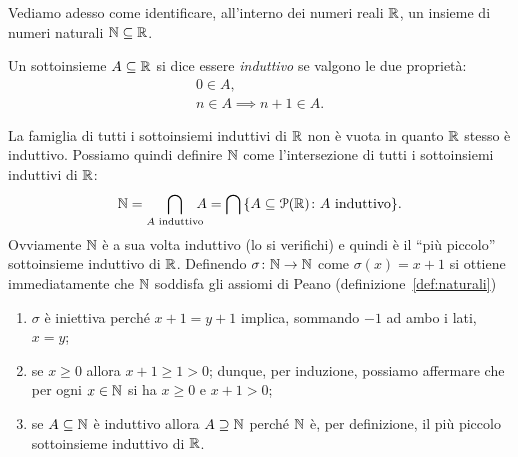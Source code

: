 Vediamo adesso come identificare, all'interno dei numeri reali ${\mathbb R}$,
un insieme di numeri naturali $\NN \subset \RR$.

\begin{definition}%
  \label{def:induttivo}%
  \mymargin{$\NN\subset \RR$}%
  Un sottoinsieme $A\subseteq {\mathbb R}$ si dice essere \emph{induttivo}
  se valgono le due proprietà:
  \begin{gather*}
    0 \in A, \\
    n\in A \implies n+1 \in A.
  \end{gather*}
\end{definition}

La famiglia di tutti i sottoinsiemi induttivi di ${\mathbb R}$ non è vuota
in quanto ${\mathbb R}$ stesso è induttivo. 
Possiamo quindi definire ${\mathbb N}$ come l'intersezione
di tutti i sottoinsiemi induttivi di ${\mathbb R}$:
\[
    {\mathbb N} 
    = \bigcap_{A\text{ induttivo}} \!\!\!\!A 
    = \bigcap{\left\{ A\subseteq\mathcal P({\mathbb R})\colon A \text{ induttivo} \right\}}.
\]
Ovviamente ${\mathbb N}$ è a sua volta induttivo (lo si verifichi) 
e quindi è il ``più piccolo'' sottoinsieme induttivo di ${\mathbb R}$.
Definendo $\sigma\colon {\mathbb N}\to {\mathbb N}$ come $\sigma(x) = x+1$ 
si ottiene 
immediatamente che ${\mathbb N}$ soddisfa gli assiomi di Peano (definizione~\ref{def:naturali})
\begin{enumerate}
    \item $\sigma$ è iniettiva perché $x+1 = y+1$ implica, sommando $-1$ ad ambo i lati,
    $x=y$;
    \item se $x\ge 0$ allora $x+1 \ge 1 > 0$; dunque, per induzione, 
    possiamo affermare che per ogni $x\in {\mathbb N}$ si ha $x\ge 0$ e $x+1>0$;
    \item se $A \subseteq {\mathbb N}$ è induttivo allora $A \supseteq {\mathbb N}$ perché 
    ${\mathbb N}$ è, per definizione, il più piccolo sottoinsieme induttivo di ${\mathbb R}$.
\end{enumerate}
% 

